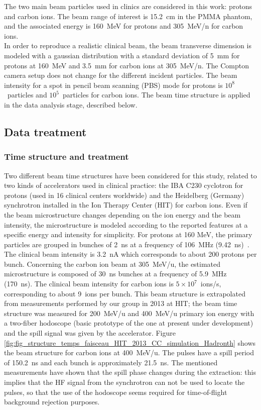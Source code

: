 The two main beam particles used in clinics are considered in this work: protons and carbon ions. The beam range of interest is 15.2~cm in the PMMA phantom, and the associated energy is 160~MeV for protons and 305~MeV/n for carbon ions.\\ 
In order to reproduce a realistic clinical beam, the beam transverse dimension is modeled with a gaussian distribution with a standard deviation of 5~mm for protons at 160~MeV and 3.5~mm for carbon ions at 305~MeV/n. The Compton camera setup does not change for the different incident particles. The beam intensity for a spot in pencil beam scanning (PBS) mode for protons is $10^8$~particles and $10^5$~particles for carbon ions. The beam time structure is applied in the data analysis stage, described below.\newline

\subsection{Data treatment}
\label{subsection:Treatment_data_CC_hadrontherapy_Geant4}

\subsubsection{Time structure and treatment}
\label{subsubsection:modelisation_fasceau_ions_CC_hadrontherapy_Geant4}
 
Two different beam time structures have been considered for this study, related to two kinds of accelerators used in clinical practice: the IBA C230 cyclotron for protons (used in 16 clinical centers worldwide) and the Heidelberg (Germany) synchrotron installed in the Ion Therapy Center (HIT) for carbon ions. Even if the beam microstructure changes depending on the ion energy and the beam intensity, the microstructure is modeled according to the reported features at a specific energy and intensity for simplicity. For protons at 160 MeV, the primary particles are grouped in bunches of 2~ns at a frequency of 106~MHz (9.42~ns)~\cite{f_roellinghoff_real-time_2014}. The clinical beam intensity is 3.2~nA which corresponds to about 200 protons per bunch. Concerning the carbon ion beam at 305~MeV/u, the estimated microstructure is composed of 30~ns bunches at a frequency of 5.9~MHz (170~ns). The clinical beam intensity for carbon ions is $5\times10^7$~ions/s, corresponding to about 9~ions per bunch. This beam structure is extrapolated from measurements performed by our group in 2013 at HIT; the beam time structure was measured for 200~MeV/u and 400~MeV/u primary ion energy with a two-fiber hodoscope (basic prototype of the one at present under development) and the spill signal was given by the accelerator. Figure \ref{fig:fig_structure_temps_faisceau_HIT_2013_CC_simulation_Hadronth} shows the beam structure for carbon ions at 400~MeV/u. The pulses have a spill period of 150.2~ns and each bunch is approximately 21.5~ns.
The mentioned measurements have shown that the spill phase changes during the extraction: this implies that the HF signal from the synchrotron can not be used to locate the pulses, so that the use of the hodoscope seems required for time-of-flight background rejection purposes.\newline

